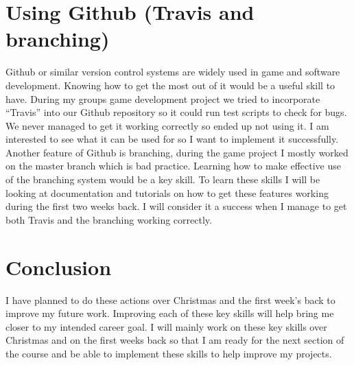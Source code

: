 \documentclass{scrartcl}
\begin{document}
\section{Using Github (Travis and branching)}

Github or similar version control systems are widely used in game and software development. Knowing how to get the most out of it would be a useful skill to have. During my groups game development project we tried to incorporate “Travis” into our Github repository so it could run test scripts to check for bugs. We never managed to get it working correctly so ended up not using it. I am interested to see what it can be used for so I want to implement it successfully. Another feature of Github is branching, during the game project I mostly worked on the master branch which is bad practice. Learning how to make effective use of the branching system would be a key skill. To learn these skills I will be looking at documentation and tutorials on how to get these features working during the first two weeks back. I will consider it a success when I manage to get both Travis and the branching working correctly.


\section{Conclusion}

I have planned to do these actions over Christmas and the first week’s back to improve my future work. Improving each of these key skills will help bring me closer to my intended career goal. I will mainly work on these key skills over Christmas and on the first weeks back so that I am ready for the next section of the course and be able to implement these skills to help improve my projects.



\end{document}
